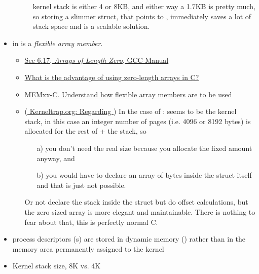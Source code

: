 \begin{itemize}
\begin{description}
    kernel stack is either 4 or 8KB, and either way a 1.7KB is pretty much, so storing a
    slimmer struct, that points to , immediately saves a lot of stack
    space and is a scalable solution.
  \end{description}
\item {} in  is a \emph{flexible array
    member}.
  \begin{itemize}
  \item \href{http://gcc.gnu.org/onlinedocs/gcc/Zero-Length.html}{%
      Sec 6.17, \emph{Arrays of Length Zero}, GCC Manual}
  \item
    \href{http://www.quora.com/C-programming-language/What-is-the-advantage-of-using-zero-length-arrays-in-C}{%
      What is the advantage of using zero-length arrays in C?}
  \item
    \href{https://www.securecoding.cert.org/confluence/display/seccode/MEMxx-C.+Understand+how+flexible+array+members+are+to+be+used}{%
      MEMxx-C. Understand how flexible array members are to be used}
  \item (\href{http://kerneltrap.org/node/5700}{%
      Kerneltrap.org: Regarding }) In the case of :
     seems to be the kernel stack, in this case an integer number
    of pages (i.e. 4096 or 8192 bytes) is allocated for the rest of  + the stack, so
    \begin{itemize}
    \item[a)] you don't need the real size because you allocate the fixed amount anyway,
      and
    \item[b)] you would have to declare an array of  bytes inside the struct itself and that is just
      not possible.
    \end{itemize}
    Or not declare the stack inside the struct but do offset calculations, but the zero
    sized array is more elegant and maintainable. There is nothing to fear about that,
    this is perfectly normal C.
  \end{itemize}
\item process descriptors (s) are stored in dynamic memory
  () rather than in the memory area permanently assigned to the kernel
\item Kernel stack size, 8K vs. 4K
  \begin{itemize}

\end{itemize}
\end{itemize}
